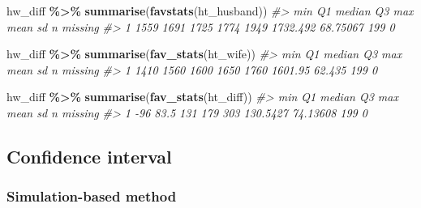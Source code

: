 \documentclass[
]{report}
\newenvironment{Shaded}{\begin{snugshade}}{\end{snugshade}}
\newcommand{\CommentTok}[1]{\textcolor[rgb]{0.56,0.35,0.01}{\textit{#1}}}
\newcommand{\FunctionTok}[1]{\textcolor[rgb]{0.13,0.29,0.53}{\textbf{#1}}}
\newcommand{\NormalTok}[1]{#1}
\newcommand{\SpecialCharTok}[1]{\textcolor[rgb]{0.81,0.36,0.00}{\textbf{#1}}}
\begin{document}
\begin{Shaded}
\begin{Highlighting}[]
\NormalTok{hw\_diff }\SpecialCharTok{\%\textgreater{}\%}
    \FunctionTok{summarise}\NormalTok{(}\FunctionTok{favstats}\NormalTok{(ht\_husband))}
\CommentTok{\#\textgreater{}    min   Q1 median   Q3  max     mean       sd   n missing}
\CommentTok{\#\textgreater{} 1 1559 1691   1725 1774 1949 1732.492 68.75067 199       0}
\end{Highlighting}
\end{Shaded}

\begin{Shaded}
\begin{Highlighting}[]
\NormalTok{hw\_diff }\SpecialCharTok{\%\textgreater{}\%}
    \FunctionTok{summarise}\NormalTok{(}\FunctionTok{fav\_stats}\NormalTok{(ht\_wife))}
\CommentTok{\#\textgreater{}    min   Q1 median   Q3  max    mean     sd   n missing}
\CommentTok{\#\textgreater{} 1 1410 1560   1600 1650 1760 1601.95 62.435 199       0}
\end{Highlighting}
\end{Shaded}

\begin{Shaded}
\begin{Highlighting}[]
\NormalTok{hw\_diff }\SpecialCharTok{\%\textgreater{}\%}
    \FunctionTok{summarise}\NormalTok{(}\FunctionTok{fav\_stats}\NormalTok{(ht\_diff))}
\CommentTok{\#\textgreater{}   min   Q1 median  Q3 max     mean       sd   n missing}
\CommentTok{\#\textgreater{} 1 {-}96 83.5    131 179 303 130.5427 74.13608 199       0}
\end{Highlighting}
\end{Shaded}

\hypertarget{confidence-interval-4}{%
\subsection*{Confidence interval}\label{confidence-interval-4}}

\hypertarget{simulation-based-method-4}{%
\subsubsection*{Simulation-based method}\label{simulation-based-method-4}}
\end{document}
